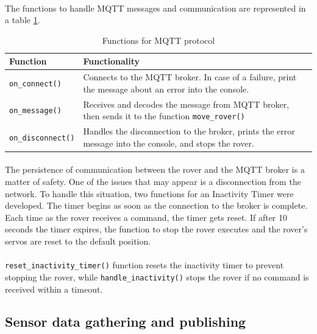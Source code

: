 \paragraph{} The functions to handle MQTT messages and communication are represented in a table \ref{tab:func_mqtt}.
\begin{table}[h]
    \centering
    \begin{longtable}{|l|p{10cm}|}
        \hline
        \textbf{Function} & \textbf{Functionality}\\
        \hline
        \lstinline|on_connect()| & Connects to the MQTT broker. In case of a failure, print the message about an error into the console.  \\
        \hline
        \lstinline|on_message()| & Receives and decodes the message from MQTT broker, then sends it to the function \lstinline|move_rover()| \\
        \hline
        \lstinline|on_disconnect()| & Handles the disconnection to the broker, prints the error message into the console, and stops the rover. \\
        \hline
    \end{longtable}
    \caption{Functions for MQTT protocol}
    \label{tab:func_mqtt}
\end{table}
\vspace{-10mm}
\paragraph{} The persistence of communication between the rover and the MQTT broker is a matter of safety. One of the issues that may appear is a disconnection from the network. To handle this situation, two functions for an Inactivity Timer were developed. The timer begins as soon as the connection to the broker is complete. Each time as the rover receives a command, the timer gets reset. If after 10 seconds the timer expires, the function to stop the rover executes and the rover's servos are reset to the default position.
\paragraph{}\lstinline|reset_inactivity_timer()| function resets the inactivity timer to prevent stopping the rover, while \lstinline|handle_inactivity()| stops the rover if no command is received within a timeout.

\subsection{Sensor data gathering and publishing}

